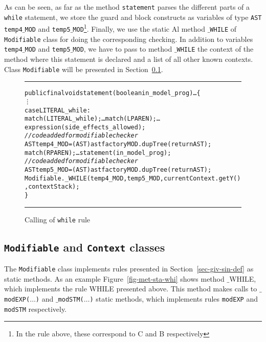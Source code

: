 \documentclass[a4paper]{llncs}
\begin{document}
As can be seen, as far as the method \texttt{statement} parses the
different parts of a \texttt{while} statement, we store the guard
and block constructs as variables of type \texttt{AST}
\texttt{temp4$\_$MOD} and \texttt{temp5$\_$MOD}\footnote{In the rule
above, these correspond to \textsc{C} and \textsc{B}
respectively}. Finally, we use the static Al method \texttt{$\_$WHILE}
of \texttt{Modifiable} class for doing the corresponding checking. In
addition to variables \texttt{temp4$\_$MOD} and \texttt{temp5$\_$MOD},
we have to pass to method \texttt{$\_$WHILE} the context of the method
where this statement is declared and a list of all other known
contexts. Class \texttt{Modifiable} will be presented in
Section~\ref{mod-and-con-clab}.
\begin{figure}[tbh]
\rule{\linewidth}{0.25mm}
\begin{alltt}
   public final void statement(boolean in_model_prog) \dots \verb!{!
      \vdots
      case LITERAL_while:
         match(LITERAL_while);\dots match(LPAREN); \dots expression(side_effects_allowed);
         {\it //code added for modifiable checker}
         AST temp4_MOD = (AST)astfactoryMOD.dupTree(returnAST);
         match(RPAREN); \dots statement(in_model_prog);
         {\it //code added for modifiable checker}
         AST temp5_MOD = (AST)astfactoryMOD.dupTree(returnAST);
         Modifiable._WHILE(temp4_MOD,temp5_MOD, currentContext.getY(), contextStack);
    \verb!}!
\end{alltt}
\caption{Calling of {\tt while} rule}
\label{fig-cal-whi-rul}
\rule{\linewidth}{0.25mm}
\end{figure}




\subsection{\texttt{Modifiable} and \texttt{Context} classes}
\label{mod-and-con-clab}
The \texttt{Modifiable} class implements rules presented in
Section~\ref{sec-giv-sin-def} as static methods. As an example
Figure~\ref{fig-met-sta-whi} shows method \textup{$\_$WHILE}, which
implements the rule \textup{WHILE} presented above. This method makes
calls to \texttt{$\_$modEXP($\dots$)} and
\texttt{$\_$modSTM($\dots$)} static methods, which implements rules
\texttt{modEXP} and \texttt{modSTM} respectively.
\end{document}
